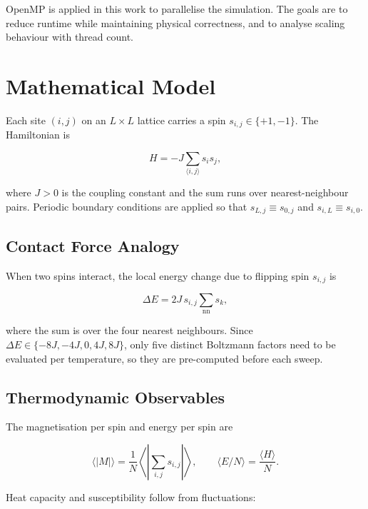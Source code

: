 \documentclass[conference]{IEEEtran}
\begin{document}
OpenMP is applied in this work to parallelise the simulation. The goals are
to reduce runtime while maintaining physical correctness, and to analyse
scaling behaviour with thread count.

\section{Mathematical Model}

Each site $(i,j)$ on an $L \times L$ lattice carries a spin
$s_{i,j} \in \{+1, -1\}$. The Hamiltonian is

\begin{equation}
  H = -J \sum_{\langle i,j \rangle} s_i s_j,
  \label{eq:H}
\end{equation}

where $J > 0$ is the coupling constant and the sum runs over nearest-neighbour
pairs. Periodic boundary conditions are applied so that
$s_{L,j} \equiv s_{0,j}$ and $s_{i,L} \equiv s_{i,0}$.

\subsection{Contact Force Analogy}

When two spins interact, the local energy change due to flipping spin
$s_{i,j}$ is

\begin{equation}
  \Delta E = 2J\, s_{i,j} \sum_{\mathrm{nn}} s_k,
  \label{eq:dE}
\end{equation}

where the sum is over the four nearest neighbours.
Since $\Delta E \in \{-8J, -4J, 0, 4J, 8J\}$, only five distinct
Boltzmann factors need to be evaluated per temperature, so they are
pre-computed before each sweep.

\subsection{Thermodynamic Observables}

The magnetisation per spin and energy per spin are

\begin{equation}
  \langle|M|\rangle = \frac{1}{N}\left\langle\left|\sum_{i,j}s_{i,j}\right|\right\rangle,
  \qquad
  \langle E/N \rangle = \frac{\langle H \rangle}{N}.
\end{equation}

Heat capacity and susceptibility follow from fluctuations:
\end{document}
